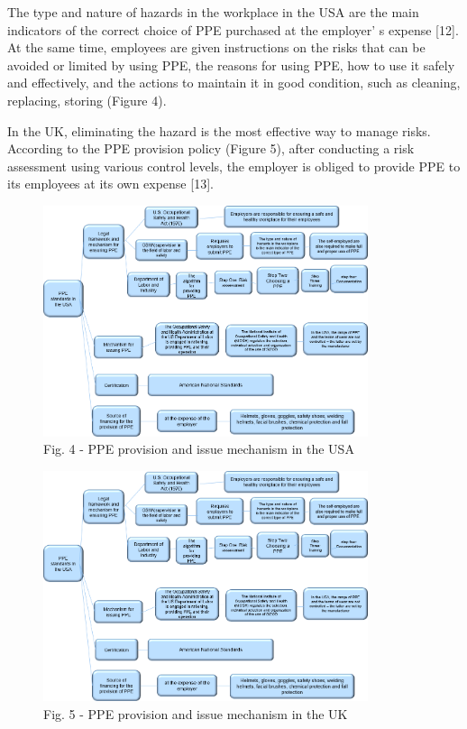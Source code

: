 \begin{multicols}{2}
The type and nature of hazards in the workplace in the USA are the main
indicators of the correct choice of PPE purchased at the
employer' s expense {[}12{]}. At the same time, employees
are given instructions on the risks that can be avoided or limited by
using PPE, the reasons for using PPE, how to use it safely and
effectively, and the actions to maintain it in good condition, such as
cleaning, replacing, storing (Figure 4).

In the UK, eliminating the hazard is the most effective way to manage
risks. According to the PPE provision policy (Figure 5), after
conducting a risk assessment using various control levels, the employer
is obliged to provide PPE to its employees at its own expense {[}13{]}.
\end{multicols}

\begin{figure}[H]
	\centering
	\includegraphics[width=0.85\textwidth]{media/chem2/image5}
	\caption*{Fig. 4 - PPE provision and issue mechanism in the USA}
\end{figure}

\begin{figure}[H]
	\centering
	\includegraphics[width=0.85\textwidth]{media/chem2/image5}
	\caption*{Fig. 5 - PPE provision and issue mechanism in the UK}
\end{figure}

